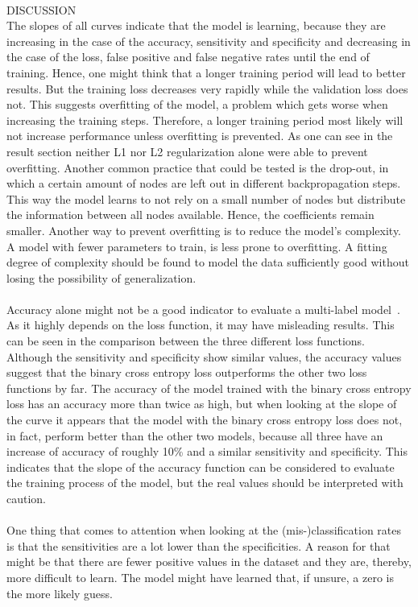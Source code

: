 \\
DISCUSSION \\
The slopes of all curves indicate that the model is learning, because they are increasing in the case of the accuracy, sensitivity and specificity and decreasing in the case of the loss, false positive and false negative rates until the end of training. Hence, one might think that a longer training period will lead to better results. But the training loss decreases very rapidly while the validation loss does not. This suggests overfitting of the model, a problem which gets worse when increasing the training steps. Therefore, a longer training period most likely will not increase performance unless overfitting is prevented. As one can see in the result section neither L1 nor L2 regularization alone were able to prevent overfitting. Another common practice that could be tested is the drop-out, in which a certain amount of nodes are left out in different backpropagation steps. This way the model learns to not rely on a small number of nodes but distribute the information between all nodes available. Hence, the coefficients remain smaller. Another way to prevent overfitting is to reduce the model's complexity. A model with fewer parameters to train, is less prone to overfitting. A fitting degree of complexity should be found to model the data sufficiently good without losing the possibility of generalization. \\
\\
Accuracy alone might not be a good indicator to evaluate a multi-label model~\citep{gibaja2015}. As it highly depends on the loss function, it may have misleading results. This can be seen in the comparison between the three different loss functions. Although the sensitivity and specificity show similar values, the accuracy values suggest that the binary cross entropy loss outperforms the other two loss functions by far. The accuracy of the model trained with the binary cross entropy loss has an accuracy more than twice as high, but when looking at the slope of the curve it appears that the model with the binary cross entropy loss does not, in fact, perform better than the other two models, because all three have an increase of accuracy of roughly 10\% and a similar sensitivity and specificity. This indicates that the slope of the accuracy function can be considered to evaluate the training process of the model, but the real values should be interpreted with caution. \\
\\
One thing that comes to attention when looking at the (mis-)classification rates is that the sensitivities are a lot lower than the specificities. A reason for that might be that there are fewer positive values in the dataset and they are, thereby, more difficult to learn. The model might have learned that, if unsure, a zero is the more likely guess. \\
